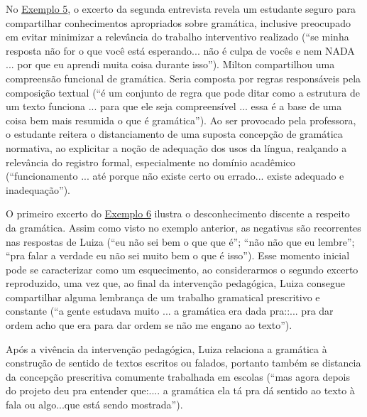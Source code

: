 

\label{anchor-10}{}

No \hyperref[tab-06]{Exemplo 5}, o excerto da segunda entrevista revela um estudante seguro
para compartilhar conhecimentos apropriados sobre gramática, inclusive
preocupado em evitar minimizar a relevância do trabalho interventivo
realizado (``se minha resposta não for o que você está esperando... não
é culpa de vocês e nem NADA ... por que eu aprendi muita coisa durante
isso''). Milton compartilhou uma compreensão funcional de gramática.
Seria composta por regras responsáveis pela composição textual (``é um
conjunto de regra que pode ditar como a estrutura de um texto funciona
... para que ele seja compreensível ... essa é a base de uma coisa bem
mais resumida o que é gramática''). Ao ser provocado pela professora, o
estudante reitera o distanciamento de uma suposta concepção de gramática
normativa, ao explicitar a noção de adequação dos usos da língua,
realçando a relevância do registro formal, especialmente no domínio
acadêmico (``funcionamento ... até porque não existe certo ou errado...
existe adequado e inadequação'').

O primeiro excerto do \hyperref[tab-07]{Exemplo 6} ilustra o desconhecimento discente a
respeito da gramática. Assim como visto no exemplo anterior, as
negativas são recorrentes nas respostas de Luiza (``eu não sei bem o que
que é''; ``não não que eu lembre''; ``pra falar a verdade eu não sei
muito bem o que é isso''). Esse momento inicial pode se caracterizar
como um esquecimento, ao considerarmos o segundo excerto reproduzido,
uma vez que, ao final da intervenção pedagógica, Luiza consegue
compartilhar alguma lembrança de um trabalho gramatical prescritivo e
constante (``a gente estudava muito ... a gramática era dada pra::...
pra dar ordem acho que era para dar ordem se não me engano ao texto'').





Após a vivência da intervenção pedagógica, Luiza relaciona a gramática à
construção de sentido de textos escritos ou falados, portanto também se
distancia da concepção prescritiva comumente trabalhada em escolas
(``mas agora depois do projeto deu pra entender que:.... a gramática ela
tá pra dá sentido ao texto à fala ou algo...que está sendo mostrada'').


